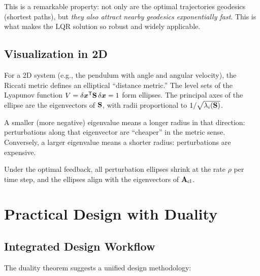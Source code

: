 This is a remarkable property: not only are the optimal trajectories geodesics (shortest paths), but \textit{they also attract
nearby geodesics exponentially fast}. This is what makes the LQR solution so robust and widely applicable.

\subsection{Visualization in 2D}

For a 2D system (e.g., the pendulum with angle and angular velocity), the Riccati metric defines an elliptical ``distance
metric.'' The level sets of the Lyapunov function $V = \delta\bm{x}^{\mathsf{T}}\mathbf{S}\,\delta\bm{x} = 1$ form ellipses. The principal axes of the
ellipse are the eigenvectors of $\mathbf{S}$, with radii proportional to $1/\sqrt{\lambda_i(\mathbf{S})}$.

A smaller (more negative) eigenvalue means a longer radius in that direction: perturbations along that eigenvector are
``cheaper'' in the metric sense. Conversely, a larger eigenvalue means a shorter radius: perturbations are expensive.

Under the optimal feedback, all perturbation ellipses shrink at the rate $\rho$ per time step, and the ellipses align with
the eigenvectors of $\mathbf{A}_{\text{cl}}$.

\section{Practical Design with Duality}

\subsection{Integrated Design Workflow}

The duality theorem suggests a unified design methodology:

